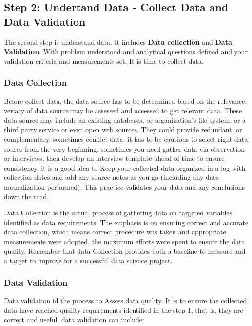 \documentclass[
]{book}
\begin{document}
\hypertarget{understanddata}{%
\subsection{Step 2: Undertand Data - Collect Data and Data Validation}\label{understanddata}}

The second step is understand data. It includes \textbf{Data collection} and \textbf{Data Validation}. With problem understood and analytical questions defined and your validation criteria and measurements set, It is time to collect data.

\hypertarget{data-collection}{%
\subsubsection*{Data Collection}\label{data-collection}}


Before collect data, the data source has to be determined based on the relevance. veriaty of data source may be assessed and accessed to get relevant data. These data source may include an existing databases, or organization's file system, or a third party service or even open web sources. They could provide redundant, or complementary, sometimes conflict data. it has to be cautious to select right data source from the very beginning. sometimes you need gather data via observation or interviews, then develop an interview template ahead of time to ensure consistency. it is a good idea to Keep your collected data organized in a log with collection dates and add any source notes as you go (including any data normalization performed). This practice validates your data and any conclusions down the road.

Data Collection is the actual process of gathering data on targeted variables identified as data requirements. The emphasis is on ensuring correct and accurate data collection, which means correct procedure was taken and appropriate measurements were adopted. the maximum efforts were spent to ensure the data quality. Remember that data Collection provides both a baseline to measure and a target to improve for a successful data science project.

\hypertarget{data-validation}{%
\subsubsection*{Data Validation}\label{data-validation}}


Data validation id the process to Assess data quality. It is to ensure the collected data have reached quality requirements identified in the step 1, that is, they are correct and useful. data validation can include:
\end{document}
